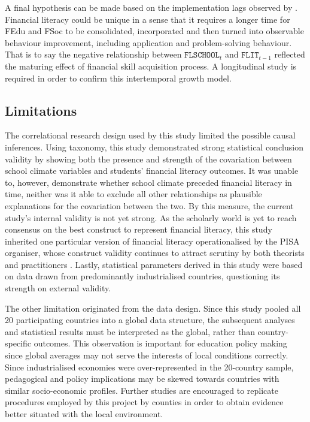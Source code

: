 A final hypothesis can be made based on the implementation lags observed by \textcite{bernheim:2001}. Financial literacy could be unique in a sense that it requires a longer time for FEdu and FSoc to be consolidated, incorporated and then turned into observable behaviour improvement, including application and problem-solving behaviour. That is to say the negative relationship between $\texttt{FLSCHOOL}_t$ and $\texttt{FLIT}_{t-1}$ reflected the maturing effect of financial skill acquisition process. A longitudinal study is required in order to confirm this intertemporal growth model.

\subsection{Limitations}

The correlational research design used by this study limited the possible causal inferences. Using  taxonomy, this study demonstrated strong statistical conclusion validity by showing both the presence and strength of the covariation between school climate variables and students' financial literacy outcomes. It was unable to, however, demonstrate whether school climate preceded financial literacy in time, neither was it able to exclude all other relationships as plausible explanations for the covariation between the two. By this measure, the current study's internal validity is not yet strong. As the scholarly world is yet to reach consensus on the best construct to represent financial literacy, this study inherited one particular version of financial literacy operationalised by the PISA organiser, whose construct validity continues to attract scrutiny by both theorists and practitioners \parencite{schuhen:2014}. Lastly, statistical parameters derived in this study were based on data drawn from predominantly industrialised countries, questioning its strength on external validity.

The other limitation originated from the data design. Since this study pooled all 20 participating countries into a global data structure, the subsequent analyses and statistical results must be interpreted as the global, rather than country-specific outcomes. This observation is important for education policy making since global averages may not serve the interests of local conditions correctly. Since industrialised economies were over-represented in the 20-country sample, pedagogical and policy implications may be skewed towards countries with similar socio-economic profiles. Further studies are encouraged to replicate procedures employed by this project by counties in order to obtain evidence better situated with the local environment.

